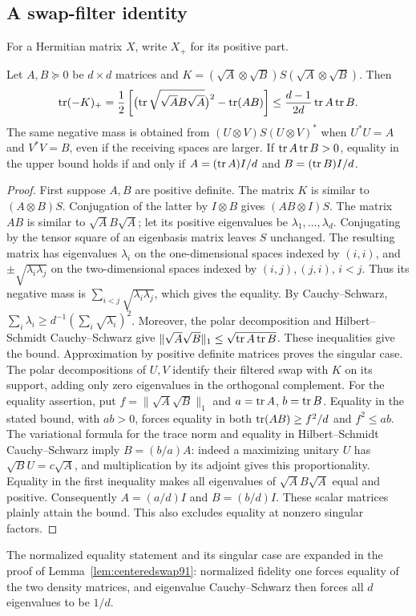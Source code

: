 \subsection{A swap-filter identity}
For a Hermitian matrix $X$, write $X_+$ for its positive part.
\begin{lemma}\label{lem:swapfilter90}
Let $A,B\succeq0$ be $d\times d$ matrices and
$K=(\sqrt A\otimes\sqrt B)S(\sqrt A\otimes\sqrt B)$.  Then
\begin{equation}\label{eq:swapfilter90}
 \operatorname{tr}(-K)_+=\frac12\left[
  \bigl(\operatorname{tr}\sqrt{\sqrt A B\sqrt A}\bigr)^2-\operatorname{tr}(AB)\right]
 \le\frac{d-1}{2d}\operatorname{tr} A\operatorname{tr} B.
\end{equation}
The same negative mass is obtained from $(U\otimes V)S(U\otimes V)^*$
when $U^*U=A$ and $V^*V=B$, even if the receiving spaces are larger.
If $\operatorname{tr} A\operatorname{tr} B>0$, equality in the upper bound holds if and only if
$A=(\operatorname{tr} A)I/d$ and $B=(\operatorname{tr} B)I/d$.
\end{lemma}
\begin{proof}
First suppose $A,B$ are positive definite.  The matrix $K$ is similar
to $(A\otimes B)S$.  Conjugation of the latter by $I\otimes B$ gives
$(AB\otimes I)S$.  The matrix $AB$ is similar to $\sqrt A B\sqrt A$;
let its positive eigenvalues be $\lambda_1,\ldots,\lambda_d$.
Conjugating by the tensor square of an eigenbasis matrix leaves $S$
unchanged.  The resulting matrix has eigenvalues $\lambda_i$ on the
one-dimensional spaces indexed by $(i,i)$, and
$\pm\sqrt{\lambda_i\lambda_j}$ on the two-dimensional spaces indexed
by $(i,j),(j,i)$, $i<j$.  Thus its negative mass is
$\sum_{i<j}\sqrt{\lambda_i\lambda_j}$, which gives the equality.
By Cauchy--Schwarz,
$\sum_i\lambda_i\ge d^{-1}(\sum_i\sqrt{\lambda_i})^2$.
Moreover, the polar decomposition and Hilbert--Schmidt Cauchy--Schwarz
give $\|\sqrt A\sqrt B\|_1\le\sqrt{\operatorname{tr} A\operatorname{tr} B}$.
These inequalities give the bound.  Approximation by positive definite
matrices proves the singular case.  The polar decompositions of $U,V$
identify their filtered swap with $K$ on its support, adding only zero
eigenvalues in the orthogonal complement.
For the equality assertion, put $f=\|\sqrt A\sqrt B\|_1$ and
$a=\operatorname{tr} A$, $b=\operatorname{tr} B$.  Equality in the stated bound, with $ab>0$,
forces equality in both $\operatorname{tr}(AB)\ge f^2/d$ and $f^2\le ab$.
The variational formula for the trace norm and equality in
Hilbert--Schmidt Cauchy--Schwarz imply $B=(b/a)A$: indeed a maximizing
unitary $U$ has $\sqrt B U=c\sqrt A$, and multiplication by its
adjoint gives this proportionality.  Equality in the first inequality
makes all eigenvalues of $\sqrt A B\sqrt A$ equal and positive.
Consequently $A=(a/d)I$ and $B=(b/d)I$.  These scalar matrices plainly
attain the bound.  This also excludes equality at nonzero singular
factors.
\end{proof}
The normalized equality statement and its singular case are expanded
in the proof of Lemma~\ref{lem:centeredswap91}: normalized fidelity one
forces equality of the two density matrices, and eigenvalue
Cauchy--Schwarz then forces all $d$ eigenvalues to be $1/d$.


